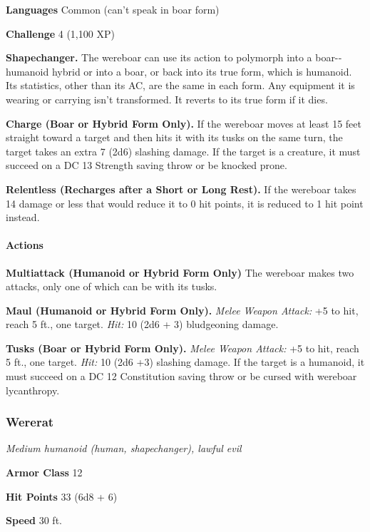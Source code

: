 \documentclass[
]{article}
\begin{document}
\textbf{Languages} Common (can't speak in boar form)

\textbf{Challenge} 4 (1,100 XP)

\textbf{Shapechanger.} The wereboar can use its action to polymorph into
a boar-­‐humanoid hybrid or into a boar, or back into its true form,
which is humanoid. Its statistics, other than its AC, are the same in
each form. Any equipment it is wearing or carrying isn't transformed. It
reverts to its true form if it dies.

\textbf{Charge (Boar or Hybrid Form Only).} If the wereboar moves at
least 15 feet straight toward a target and then hits it with its tusks
on the same turn, the target takes an extra 7 (2d6) slashing damage. If
the target is a creature, it must succeed on a DC 13 Strength saving
throw or be knocked prone.

\textbf{Relentless (Recharges after a Short or Long Rest).} If the
wereboar takes 14 damage or less that would reduce it to 0 hit points,
it is reduced to 1 hit point instead.

\hypertarget{actions-4}{%
\paragraph{Actions}\label{actions-4}}

\textbf{Multiattack (Humanoid or Hybrid Form Only)} The wereboar makes
two attacks, only one of which can be with its tusks.

\textbf{Maul (Humanoid or Hybrid Form Only).} \emph{Melee Weapon
Attack:} +5 to hit, reach 5 ft., one target. \emph{Hit:} 10 (2d6 + 3)
bludgeoning damage.

\textbf{Tusks (Boar or Hybrid Form Only).} \emph{Melee Weapon Attack:}
+5 to hit, reach 5 ft., one target. \emph{Hit:} 10 (2d6 +3) slashing
damage. If the target is a humanoid, it must succeed on a DC 12
Constitution saving throw or be cursed with wereboar lycanthropy.

\hypertarget{wererat}{%
\subsubsection{Wererat}\label{wererat}}

\emph{Medium humanoid (human, shapechanger), lawful evil}

\textbf{Armor Class} 12

\textbf{Hit Points} 33 (6d8 + 6)

\textbf{Speed} 30 ft.
\end{document}
